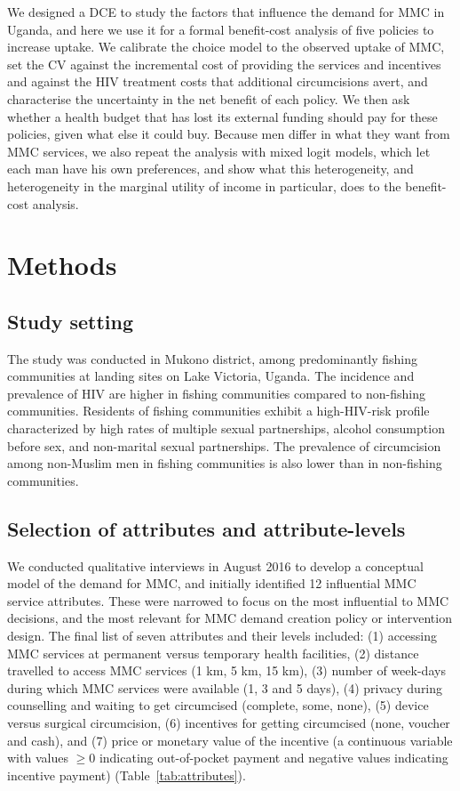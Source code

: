 \documentclass[11pt]{article}
\numberwithin{equation}{section}\numberwithin{figure}{section}\numberwithin{table}{section}
\begin{document}
We designed a DCE to study the factors that influence the demand for MMC in Uganda, and here we use it for a formal benefit-cost analysis of five policies to increase uptake. We calibrate the choice model to the observed uptake of MMC, set the CV against the incremental cost of providing the services and incentives and against the HIV treatment costs that additional circumcisions avert, and characterise the uncertainty in the net benefit of each policy. We then ask whether a health budget that has lost its external funding should pay for these policies, given what else it could buy. Because men differ in what they want from MMC services, we also repeat the analysis with mixed logit models, which let each man have his own preferences, and show what this heterogeneity, and heterogeneity in the marginal utility of income in particular, does to the benefit-cost analysis.


\section{Methods}
\subsection{Study setting}
The study was conducted in Mukono district, among predominantly fishing communities at landing sites on Lake Victoria, Uganda. The incidence and prevalence of HIV are higher in fishing communities compared to non-fishing communities.\cite{RN200,RN274} Residents of fishing communities exhibit a high-HIV-risk profile characterized by high rates of multiple sexual partnerships, alcohol consumption before sex, and non-marital sexual partnerships. The prevalence of circumcision among non-Muslim men in fishing communities is also lower than in non-fishing communities.\cite{RN274}

\subsection{Selection of attributes and attribute-levels}
We conducted qualitative interviews in August 2016 to develop a conceptual model of the demand for MMC, and initially identified 12 influential MMC service attributes. These were narrowed to focus on the most influential to MMC decisions, and the most relevant for MMC demand creation policy or intervention design. The final list of seven attributes and their levels included: (1) accessing MMC services at permanent versus temporary health facilities, (2) distance travelled to access MMC services (1 km, 5 km, 15 km), (3) number of week-days during which MMC services were available (1, 3 and 5 days), (4) privacy during counselling and waiting to get circumcised (complete, some, none), (5) device versus surgical circumcision, (6) incentives for getting circumcised (none, voucher and cash), and (7) price or monetary value of the incentive (a continuous variable with values $\geq 0$ indicating out-of-pocket payment and negative values indicating incentive payment) (Table~\ref{tab:attributes}).
\end{document}
